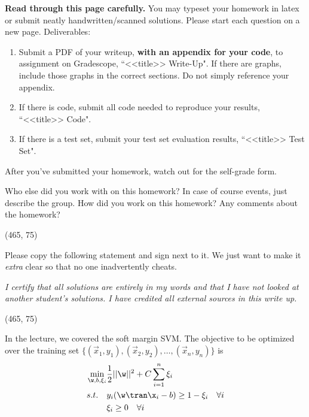 \documentclass[preview]{standalone}
\begin{document}
\fontsize{12}{15}\selectfont


\textbf{Read through this page carefully.} You may typeset your homework in latex or submit neatly handwritten/scanned solutions. Please start each question on a new page. Deliverables:

\begin{enumerate}
  \item Submit a PDF of your writeup, \textbf{with an appendix for your code}, to assignment on Gradescope, ``<<title>> Write-Up". If there are graphs, include those graphs in the correct sections. Do not simply reference your appendix.
  \item If there is code, submit all code needed to reproduce your results, ``<<title>> Code".
  \item If there is a test set, submit your test set evaluation results, ``<<title>> Test Set".
\end{enumerate}

After you've submitted your homework, watch out for the self-grade form.

\begin{Parts}

\Part Who else did you work with on this homework? In case of course events, just describe the group. How did you work on this homework? Any comments about the homework?

\vspace{15pt}
\framebox(465, 75){}

\Part Please copy the following statement and sign next to it. We just want to make it \textit{extra} clear so that no one inadvertently cheats.

\textit{I certify that all solutions are entirely in my words and that I have not looked at another student's solutions. I have credited all external sources in this write up.}

\vspace{15pt}
\framebox(465, 75){}

\end{Parts}

\pagebreak


\newcommand{\lag}{\mathcal{L}}
\newcommand{\blam}{\mathbb{\lambda}}
\newcommand{\bnu}{\mathbb{\nu}}
\newcommand{\balpha}{\mathbb{\alpha}}

In the lecture, we covered the soft margin SVM. The objective to be optimized over the training set
$\{(\vec x_1, y_1), (\vec x_2, y_2), \dots, (\vec x_n, y_n)\}$ is
\begin{align}
\min_{\w, b, \xi_i} & \frac{1}{2}||\w||^2 + C\sum_{i=1}^{n} \xi_i   \\
s.t. \quad & y_i (\w\tran \x_i -b) \geq 1 - \xi_i \quad \forall i \\
     & \xi_i \geq 0 \quad \forall i
\end{align}
\end{document}
